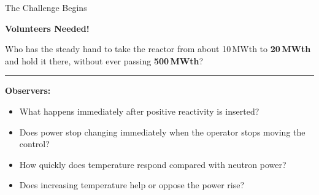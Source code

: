 \documentclass[aspectratio=169]{beamer}
\begin{document}
\begin{frame}{The Challenge Begins}

    \centering

    \Huge
    \textbf{Volunteers Needed!}

    \vspace{1.2em}

    \normalsize

    Who has the steady hand to take the reactor from about 10\,MWth to
    \textbf{20\,MWth} and hold it there, without ever passing
    \textbf{500\,MWth}?

    \vspace{1.2em}

    \hrule

    \vspace{0.8em}

    \textbf{Observers:}

    \begin{itemize}

        \item What happens immediately after positive reactivity is inserted?

        \item Does power stop changing immediately when the operator stops
              moving the control?

        \item How quickly does temperature respond compared with neutron power?

        \item Does increasing temperature help or oppose the power rise?

    \end{itemize}

\end{frame}


\end{document}
